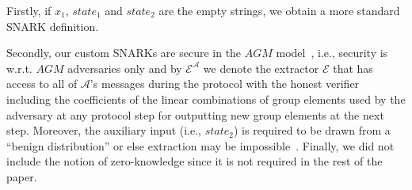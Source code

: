\noindent Firstly, if $x_1$, $\mathit{state_1}$ and $\mathit{state_2}$ are the empty strings, we obtain a more standard SNARK definition.
\begin{comment}Secondly, $\mathcal{R}$ is not a component of the vector $\mathit{aux_{\mathit{SNARK}}}$ so even if $\mathit{SNARK.Setup}$ has 
$\mathit{aux_{\mathit{SNARK}}}$ as parameter, it is universal, 
i.e., it can be used to derive proving and verification keys for circuits of any size up to a polynomial in the security parameter $\lambda$,   
independently of any specific NP relation. Moreover, for the SNARKs we design, the size of the key used by 
the honest verifier is much smaller than the size of the honest prover's key. We have made the separation clear between the two keys to be able 
to better capture this special case; however, a potential adversarial prover has access to the complete $\mathit{srs}$ key. \end{comment}
Secondly, our custom SNARKs are secure in the $\mathit{AGM}$ model~\cite{AGM_model}, i.e., security is w.r.t. $\mathit{AGM}$ adversaries only 
and by $\mathcal{E}^{\mathcal{A}}$ we denote the extractor $\mathcal{E}$ that has access to all of 
$\mathcal{A}$'s messages during the protocol with the honest verifier including the coefficients of the linear combinations of 
group elements used by the adversary at any protocol step for outputting new group elements at the next step. 
Moreover, the auxiliary input (i.e., $\mathit{state_2}$) is required to be drawn from a ``benign distribution'' or else extraction may be 
impossible~\cite{extractability_limits_1,extractability_limits_2}. 
Finally, we did not include the notion of zero-knowledge since it is not required in the rest of the paper.
\vspace{-0.07in}
